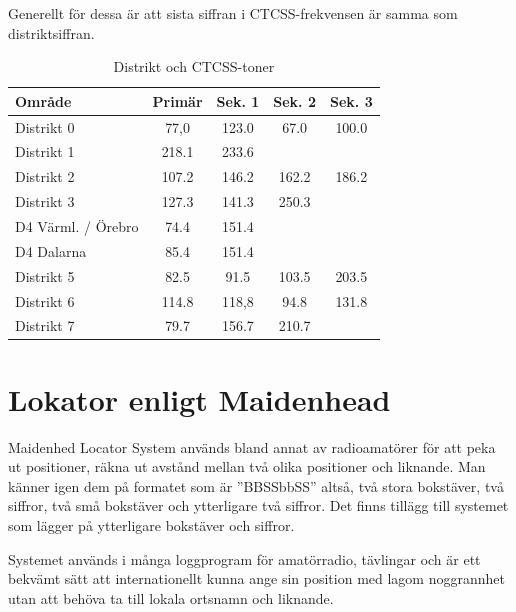 Generellt för dessa är att sista siffran i CTCSS-frekvensen är samma som
distriktsiffran.

\begin{table}[H]
\centering
\begin{tabular}{lcccc}
	\textbf{Område}    & \textbf{Primär} & \textbf{Sek. 1} & \textbf{Sek. 2} & \textbf{Sek. 3} \\ \hline
	Distrikt 0         & 77,0            & 123.0           & 67.0            & 100.0           \\
	Distrikt 1         & 218.1           & 233.6           &                 &                 \\
	Distrikt 2         & 107.2           & 146.2           & 162.2           & 186.2           \\
	Distrikt 3         & 127.3           & 141.3           & 250.3           &                 \\
	D4 Värml. / Örebro & 74.4            & 151.4           &                 &                 \\
	D4 Dalarna         & 85.4            & 151.4           &                 &                 \\
	Distrikt 5         & 82.5            & 91.5            & 103.5           & 203.5           \\
	Distrikt 6         & 114.8           & 118,8           & 94.8            & 131.8           \\
	Distrikt 7         & 79.7            & 156.7           & 210.7           &
\end{tabular}
\caption{Distrikt och CTCSS-toner}
\end{table}

\section{Lokator enligt Maidenhead}

Maidenhed Locator System används bland annat av radioamatörer för att peka ut
positioner, räkna ut avstånd mellan två olika positioner och liknande. Man
känner igen dem på formatet som är ''BBSSbbSS'' altså, två stora bokstäver,
två siffror, två små bokstäver och ytterligare två siffror. Det finns tillägg
till systemet som lägger på ytterligare bokstäver och siffror.

Systemet används i många loggprogram för amatörradio, tävlingar och är ett
bekvämt sätt att internationellt kunna ange sin position med lagom noggrannhet
utan att behöva ta till lokala ortsnamn och liknande.

